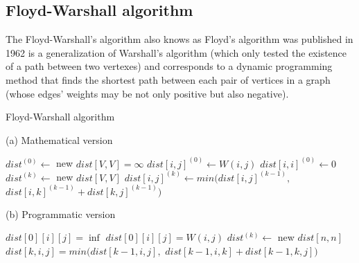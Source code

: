 \subsection{Floyd-Warshall algorithm} \label{algorithm-shortestpath-floydwarshall}
The Floyd-Warshall's algorithm also knows as Floyd's algorithm was published in 1962 is a generalization of Warshall's algorithm 
(which only tested the existence of a path between two vertexes) and corresponds to a dynamic programming method 
that finds the shortest path between each pair of vertices in a graph (whose edges' weights may be not only positive but also negative).

\begin{algorithm}[ht]
    \caption{Floyd-Warshall algorithm}
    \label{alg:floyd-warshall}
    \begin{minipage}[t]{0.49\linewidth}
        (a) Mathematical version
        \begin{algorithmic}[1]
                    \State $dist^{(0)} \gets $ new $ dist[V, V] = \infty$
                        \State $dist[i,j]^{(0)} \gets W(i,j)$
                    \EndFor
                        \State $dist[i,i]^{(0)} \gets 0$
                    \EndFor
                    \State $dist^{(k)} \gets $ new $ dist[V, V]$
                            \State $dist[i,j]^{(k)} \gets min( dist[i,j]^{(k-1)},$
                            $dist[i,k]^{(k-1)} + dist[k,j]^{(k-1)} )$
                        \EndFor
                    \EndFor
                \EndFor
                \State {}
            \EndFunction
        \end{algorithmic}
    \end{minipage}
    \begin{minipage}[t]{0.49\linewidth}
        (b) Programmatic version
        \begin{algorithmic}[1]
                        \State $dist[0][i][j] = \inf$
                            \State $dist[0][i][j] = W(i,j)$
                        \EndIf
                    \EndFor
                \EndFor
                    \State $dist^{(k)} \gets $ new $ dist[n, n]$
                            \State $dist[k,i,j] = min(dist[k-1,i,j],$
                            $dist[k-1,i,k] + dist[k-1,k,j])$
                        \EndFor
                    \EndFor
                \EndFor
                \State {}
            \EndFunction
        \end{algorithmic}
    \end{minipage}
\end{algorithm}
